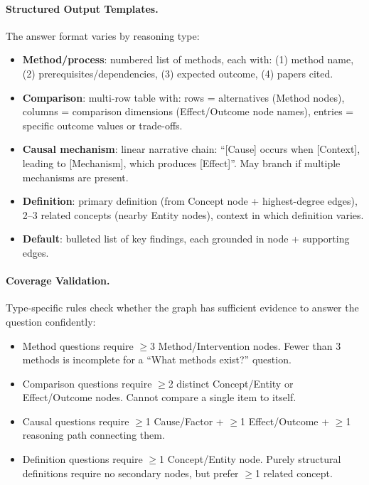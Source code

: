 \documentclass[11pt]{article}
\begin{document}
\paragraph{Structured Output Templates.} The answer format varies by reasoning type:
\begin{itemize}[leftmargin=1.2em]
  \item \textbf{Method/process}: numbered list of methods, each with: (1) method name, (2) prerequisites/dependencies, (3) expected outcome, (4) papers cited.
  \item \textbf{Comparison}: multi-row table with: rows = alternatives (Method nodes), columns = comparison dimensions (Effect/Outcome node names), entries = specific outcome values or trade-offs.
  \item \textbf{Causal mechanism}: linear narrative chain: ``[Cause] occurs when [Context], leading to [Mechanism], which produces [Effect]''. May branch if multiple mechanisms are present.
  \item \textbf{Definition}: primary definition (from Concept node + highest-degree edges), 2--3 related concepts (nearby Entity nodes), context in which definition varies.
  \item \textbf{Default}: bulleted list of key findings, each grounded in node + supporting edges.
\end{itemize}

\paragraph{Coverage Validation.} Type-specific rules check whether the graph has sufficient evidence to answer the question confidently:
\begin{itemize}[leftmargin=1.2em]
  \item Method questions require $\geq$3 Method/Intervention nodes. Fewer than 3 methods is incomplete for a ``What methods exist?'' question.
  \item Comparison questions require $\geq$2 distinct Concept/Entity or Effect/Outcome nodes. Cannot compare a single item to itself.
  \item Causal questions require $\geq$1 Cause/Factor + $\geq$1 Effect/Outcome + $\geq$1 reasoning path connecting them.
  \item Definition questions require $\geq$1 Concept/Entity node. Purely structural definitions require no secondary nodes, but prefer $\geq$1 related concept.
\end{itemize}
\end{document}
